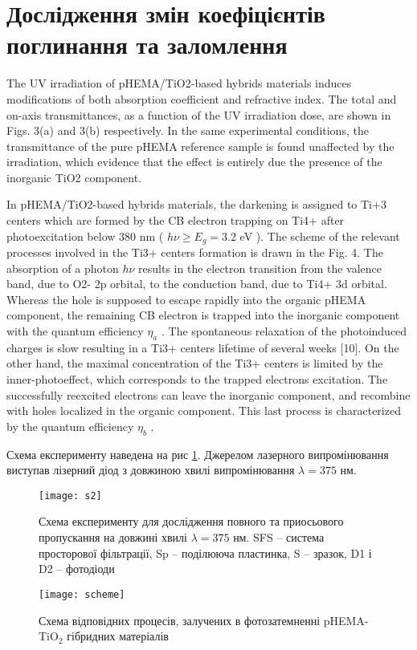 \section{Дослідження змін коефіцієнтів поглинання та заломлення}

The UV irradiation of pHEMA/TiO2-based hybrids materials induces modifications of
both absorption coefficient and refractive index. The total and on-axis transmittances, as a
function of the UV irradiation dose, are shown in Figs. 3(a) and 3(b) respectively. In the same
experimental conditions, the transmittance of the pure pHEMA reference sample is found
unaffected by the irradiation, which evidence that the effect is entirely due the presence of the
inorganic TiO2 component. 

In pHEMA/TiO2-based hybrids materials, the darkening is assigned to Ti+3 centers
which are formed by the CB electron trapping on Ti4+ after photoexcitation below 380 nm
( $h\nu \geq E_g = 3.2$ eV ). The scheme of the relevant processes involved in the Ti3+ centers
formation is drawn in the Fig. 4. The absorption of a photon $h\nu$ results in the electron
transition from the valence band, due to O2- 2p orbital, to the conduction band, due to Ti4+ 3d
orbital. Whereas the hole is supposed to escape rapidly into the organic pHEMA component,
the remaining CB electron is trapped into the inorganic component with the quantum
efficiency $\eta_a$ . The spontaneous relaxation of the photoinduced charges is slow resulting in a
Ti3+ centers lifetime of several weeks [10]. On the other hand, the maximal concentration of
the Ti3+ centers is limited by the inner-photoeffect, which corresponds to the trapped electrons
excitation. The successfully reexcited electrons can leave the inorganic component, and
recombine with holes localized in the organic component. This last process is characterized by
the quantum efficiency $\eta_b$ . 

Схема експерименту наведена на рис \ref{fig:s2}. Джерелом лазерного випромінювання виступав лізерний діод з довжиною хвилі випромінювання $\lambda = 375$ нм.

\begin{figure}
\texttt{[image: s2]}
\caption{Схема експерименту для дослідження повного та приосьового пропускання на довжині хвилі $\lambda = 375$ нм. SFS -- система просторової фільтрації, Sp -- поділююча пластинка, S -- зразок, D1 і D2 -- фотодіоди}\label{fig:s2}
\end{figure}
\pagebreak
\begin{figure}
\centering
\texttt{[image: scheme]}
\caption{Схема відповідних процесів, залучених в фотозатемненні pHEMA-TiO$_2$ гібридних матеріалів}\label{fig:s_pd}
\end{figure}


